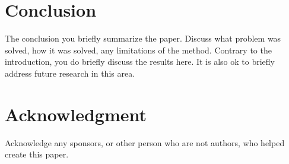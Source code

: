 \documentclass[paper]{aiaaNew}
\begin{document}
\section{Conclusion}
The conclusion you briefly summarize the paper.  Discuss what problem was solved, how it was solved, any limitations of the method.  Contrary to the introduction, you do briefly discuss the results here.  It is also ok to briefly address future research in this area.  



\section*{Acknowledgment}
Acknowledge any sponsors, or other person who are not authors, who helped create this paper.  

\end{document}
